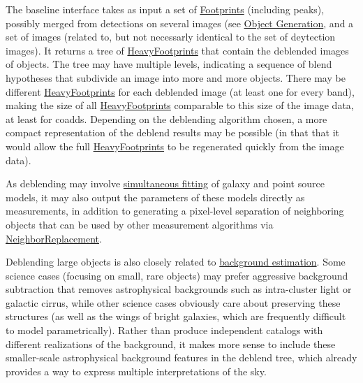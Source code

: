 The baseline interface takes as input a set of \hyperref[sec:spFootprints]{Footprints} (including peaks), possibly merged from detections on several images (see \hyperref[sec:acObjectGeneration]{Object Generation}, and a set of images (related to, but not necessarly identical to the set of deytection images).  It returns a tree of \hyperref[sec:spFootprintsHeavy]{HeavyFootprints} that contain the deblended images of objects.  The tree may have multiple levels, indicating a sequence of blend hypotheses that subdivide an image into more and more objects.  There may be different \hyperref[sec:spFootprintsHeavy]{HeavyFootprints} for each deblended image (at least one for every band), making the size of all \hyperref[sec:spFootprintsHeavy]{HeavyFootprints} comparable to this size of the image data, at least for coadds.  Depending on the deblending algorithm chosen, a more compact representation of the deblend results may be possible (in that that it would allow the full \hyperref[sec:spFootprintsHeavy]{HeavyFootprints} to be regenerated quickly from the image data).

As deblending may involve \hyperref[sec:acSimultaneousFitting]{simultaneous fitting} of galaxy and point source models, it may also output the parameters of these models directly as measurements, in addition to generating a pixel-level separation of neighboring objects that can be used by other measurement algorithms via \hyperref[sec:acNeighborReplacement]{NeighborReplacement}.

Deblending large objects is also closely related to \hyperref[sec:acBackgroundEstimation]{background estimation}.  Some science cases (focusing on small, rare objects) may prefer aggressive background subtraction that removes astrophysical backgrounds such as intra-cluster light or galactic cirrus, while other science cases obviously care about preserving these structures (as well as the wings of bright galaxies, which are frequently difficult to model parametrically).  Rather than produce independent catalogs with different realizations of the background, it makes more sense to include these smaller-scale astrophysical background features in the deblend tree, which already provides a way to express multiple interpretations of the sky.

